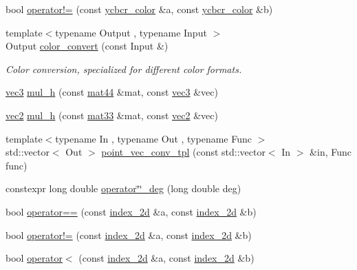 \begin{DoxyCompactItemize}
\item 
bool \hyperlink{namespacetlz_a8c4e218d04c33edf551865f7d9450e85}{operator!=} (const \hyperlink{structtlz_1_1ycbcr__color}{ycbcr\+\_\+color} \&a, const \hyperlink{structtlz_1_1ycbcr__color}{ycbcr\+\_\+color} \&b)
\item 
{\footnotesize template$<$typename Output , typename Input $>$ }\\Output \hyperlink{namespacetlz_aa6d711844af32ad824b8011e0ef067e2}{color\+\_\+convert} (const Input \&)
\begin{DoxyCompactList}\small\item\em Color conversion, specialized for different color formats. \end{DoxyCompactList}\item 
\hyperlink{namespacetlz_ad0646d752ddb9d40d702d40cc6dc54a1}{vec3} \hyperlink{namespacetlz_a1b96e05afba5d411f359ae7b873aa8fe}{mul\+\_\+h} (const \hyperlink{namespacetlz_a56693a40f2ef608241dddb9064281089}{mat44} \&mat, const \hyperlink{namespacetlz_ad0646d752ddb9d40d702d40cc6dc54a1}{vec3} \&vec)
\item 
\hyperlink{namespacetlz_ae192989bfbe6c700ac84d2a8cf05ebb4}{vec2} \hyperlink{namespacetlz_ae11356c6c2cc4c93f6924ecf6798b723}{mul\+\_\+h} (const \hyperlink{namespacetlz_a6679497d5121f319147594e1f344ef57}{mat33} \&mat, const \hyperlink{namespacetlz_ae192989bfbe6c700ac84d2a8cf05ebb4}{vec2} \&vec)
\item 
{\footnotesize template$<$typename In , typename Out , typename Func $>$ }\\std\+::vector$<$ Out $>$ \hyperlink{namespacetlz_aa4fb2ce44bd60f165cde6f239a061540}{point\+\_\+vec\+\_\+conv\+\_\+tpl} (const std\+::vector$<$ In $>$ \&in, Func func)
\item 
constexpr long double \hyperlink{namespacetlz_a529aabca4f85e8362770d8660b0092e8}{operator\char`\"{}\char`\"{}\+\_\+deg} (long double deg)
\item 
bool \hyperlink{namespacetlz_acfd8fa384ddfcd57b3ab814a2a9ac318}{operator==} (const \hyperlink{structtlz_1_1index__2d}{index\+\_\+2d} \&a, const \hyperlink{structtlz_1_1index__2d}{index\+\_\+2d} \&b)
\item 
bool \hyperlink{namespacetlz_a288025c8772d3d9a741922fc4e3e8095}{operator!=} (const \hyperlink{structtlz_1_1index__2d}{index\+\_\+2d} \&a, const \hyperlink{structtlz_1_1index__2d}{index\+\_\+2d} \&b)
\item 
bool \hyperlink{namespacetlz_afafc5b9d64375baf8489a097faeb47ec}{operator$<$} (const \hyperlink{structtlz_1_1index__2d}{index\+\_\+2d} \&a, const \hyperlink{structtlz_1_1index__2d}{index\+\_\+2d} \&b)

\end{DoxyCompactItemize}
